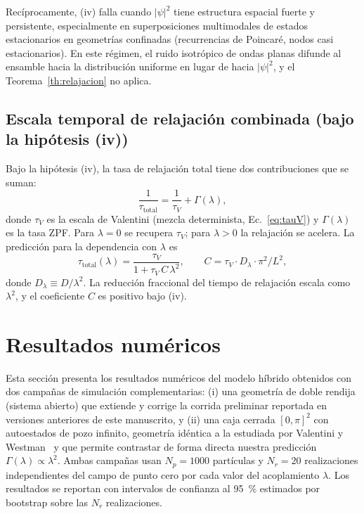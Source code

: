 \documentclass[11pt,a4paper]{article}
\begin{document}
Recíprocamente, (iv) falla cuando $|\psi|^2$ tiene estructura espacial
fuerte y persistente, especialmente en superposiciones multimodales de
estados estacionarios en geometrías confinadas (recurrencias de
Poincaré, nodos casi estacionarios). En este régimen, el ruido
isotrópico de ondas planas difunde al ensamble hacia la distribución
uniforme en lugar de hacia $|\psi|^2$, y el Teorema~\ref{th:relajacion}
no aplica.

\subsection{Escala temporal de relajación combinada (bajo la hipótesis (iv))}
\label{sec:tau_combinada}

Bajo la hipótesis (iv), la tasa de relajación total tiene dos
contribuciones que se suman:
\begin{equation}
\frac{1}{\tau_\text{total}} = \frac{1}{\tau_V} + \Gamma(\lambda),
\label{eq:tau_total}
\end{equation}
donde $\tau_V$ es la escala de Valentini (mezcla determinista,
Ec.~\ref{eq:tauV}) y $\Gamma(\lambda)$ es la tasa ZPF. Para $\lambda=0$
se recupera $\tau_V$; para $\lambda>0$ la relajación se acelera. La
predicción para la dependencia con $\lambda$ es
\begin{equation}
\tau_\text{total}(\lambda) = \frac{\tau_V}{1 + \tau_V\,C\,\lambda^2},
\qquad C = \tau_V\cdot D_\lambda\cdot\pi^2/L^2,
\label{eq:tau_lam}
\end{equation}
donde $D_\lambda\equiv D/\lambda^2$. La reducción fraccional del tiempo
de relajación escala como $\lambda^2$, y el coeficiente $C$ es positivo
bajo (iv).

\section{Resultados numéricos}
\label{sec:resultados}

Esta sección presenta los resultados numéricos del modelo híbrido
obtenidos con dos campañas de simulación complementarias:
(i) una geometría de doble rendija (sistema abierto) que extiende y
corrige la corrida preliminar reportada en versiones anteriores de este
manuscrito, y (ii) una caja cerrada $[0,\pi]^2$ con autoestados de pozo
infinito, geometría idéntica a la estudiada por Valentini y
Westman~\cite{ValentiniWestman2005} y que permite contrastar de forma
directa nuestra predicción $\Gamma(\lambda)\propto\lambda^2$. Ambas
campañas usan $N_p=1000$ partículas y $N_r=20$ realizaciones
independientes del campo de punto cero por cada valor del acoplamiento
$\lambda$. Los resultados se reportan con intervalos de confianza al
\SI{95}{\percent} estimados por bootstrap sobre las $N_r$ realizaciones.
\end{document}
